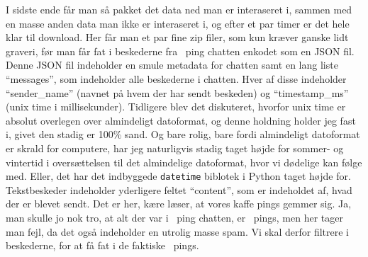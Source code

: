 \begin{article}
I sidste ende får man så pakket det data ned man er interaseret i, sammen med en masse anden data man ikke er interaseret i, og efter et par timer er det hele klar til download. Her får man et par fine zip filer, som kun kræver ganske lidt graveri, før man får fat i beskederne fra \coffee\ ping chatten enkodet som en JSON fil.
Denne JSON fil indeholder en smule metadata for chatten samt en lang liste ``messages'', som indeholder alle beskederne i chatten. Hver af disse indeholder ``sender\_name'' (navnet på hvem der har sendt beskeden) og ``timestamp\_ms'' (unix time i millisekunder). Tidligere blev det diskuteret, hvorfor unix time er absolut overlegen over almindeligt datoformat, og denne holdning holder jeg fast i, givet den stadig er 100\% sand.
Og bare rolig, bare fordi almindeligt datoformat er skrald for computere, har jeg naturligvis stadig taget højde for sommer- og vintertid i oversættelsen til det almindelige datoformat, hvor vi dødelige kan følge med. Eller, det har det indbyggede \texttt{datetime} biblotek i Python taget højde for.
Tekstbeskeder indeholder yderligere feltet ``content'', som er indeholdet af, hvad der er blevet sendt. Det er her, kære læser, at vores kaffe pings gemmer sig. Ja, man skulle jo nok tro, at alt der var i \coffee\ ping chatten, er \coffee\ pings, men her tager man fejl, da det også indeholder en utrolig masse spam. Vi skal derfor filtrere i beskederne, for at få fat i de faktiske \coffee\ pings.


\end{article}
